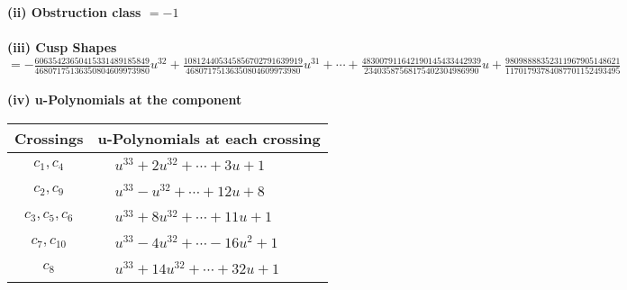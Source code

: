 \documentclass[1p]{elsarticle_modified}
\theoremstyle{definition}
\begin{document}
\flushleft \textbf{(ii) Obstruction class $= -1$}\\~\\
\flushleft \textbf{(iii) Cusp Shapes $= -\frac{60635423650415331489185849}{46807175136350804609973980} u^{32}+\frac{108124405345856702791639919}{46807175136350804609973980} u^{31}+\cdots+\frac{483007911642190145433442939}{23403587568175402304986990} u+\frac{98098888352311967905148621}{11701793784087701152493495}$}\\~\\
\newpage\renewcommand{\arraystretch}{1}
\flushleft \textbf{(iv) u-Polynomials at the component}\newline \\
\begin{tabular}{m{50pt}|m{274pt}}
Crossings & \hspace{64pt}u-Polynomials at each crossing \\
\hline $$\begin{aligned}c_{1},c_{4}\end{aligned}$$&$\begin{aligned}
&u^{33}+2 u^{32}+\cdots+3 u+1
\end{aligned}$\\
\hline $$\begin{aligned}c_{2},c_{9}\end{aligned}$$&$\begin{aligned}
&u^{33}- u^{32}+\cdots+12 u+8
\end{aligned}$\\
\hline $$\begin{aligned}c_{3},c_{5},c_{6}\end{aligned}$$&$\begin{aligned}
&u^{33}+8 u^{32}+\cdots+11 u+1
\end{aligned}$\\
\hline $$\begin{aligned}c_{7},c_{10}\end{aligned}$$&$\begin{aligned}
&u^{33}-4 u^{32}+\cdots-16 u^2+1
\end{aligned}$\\
\hline $$\begin{aligned}c_{8}\end{aligned}$$&$\begin{aligned}
&u^{33}+14 u^{32}+\cdots+32 u+1
\end{aligned}$\\
\hline
\end{tabular}\\~\\
\end{document}
